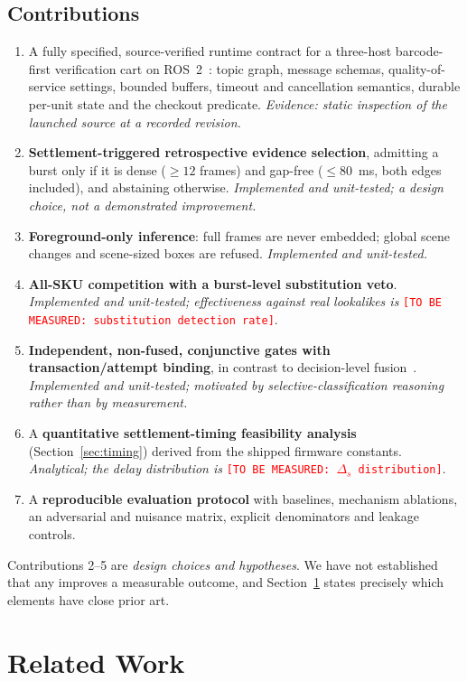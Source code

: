 \documentclass[conference]{IEEEtran}
\newcommand{\tbm}[1]{\textcolor{red}{\texttt{[TO BE MEASURED: #1]}}}
\begin{document}
\subsection{Contributions}
\begin{enumerate}
\item A fully specified, source-verified runtime contract for a three-host barcode-first verification
cart on ROS~2~\cite{R54}: topic graph, message schemas, quality-of-service settings, bounded buffers,
timeout and cancellation semantics, durable per-unit state and the checkout predicate.
\emph{Evidence: static inspection of the launched source at a recorded revision.}
\item \textbf{Settlement-triggered retrospective evidence selection}, admitting a burst only if it is
dense ($\geq 12$ frames) and gap-free ($\leq 80$~ms, both edges included), and abstaining otherwise.
\emph{Implemented and unit-tested; a design choice, not a demonstrated improvement.}
\item \textbf{Foreground-only inference}: full frames are never embedded; global scene changes and
scene-sized boxes are refused. \emph{Implemented and unit-tested.}
\item \textbf{All-SKU competition with a burst-level substitution veto}. \emph{Implemented and
unit-tested; effectiveness against real lookalikes is} \tbm{substitution detection rate}.
\item \textbf{Independent, non-fused, conjunctive gates with transaction/attempt binding}, in contrast
to decision-level fusion~\cite{R01}. \emph{Implemented and unit-tested; motivated by
selective-classification reasoning~\cite{R61} rather than by measurement.}
\item A \textbf{quantitative settlement-timing feasibility analysis} (Section~\ref{sec:timing})
derived from the shipped firmware constants. \emph{Analytical; the delay distribution is}
\tbm{$\Delta_s$ distribution}.
\item A \textbf{reproducible evaluation protocol} with baselines, mechanism ablations, an adversarial
and nuisance matrix, explicit denominators and leakage controls.
\end{enumerate}
Contributions 2--5 are \emph{design choices and hypotheses}. We have not established that any
improves a measurable outcome, and Section~\ref{sec:related} states precisely which elements have
close prior art.

\section{Related Work}
\label{sec:related}
\end{document}
